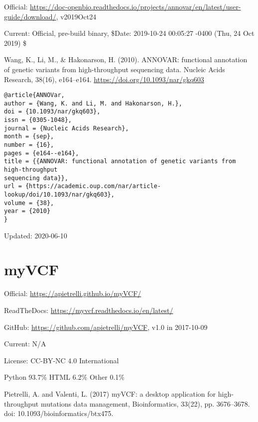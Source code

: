 \documentclass[]{article}
\begin{document}
Official: \url{https://doc-openbio.readthedocs.io/projects/annovar/en/latest/user-guide/download/}, v2019Oct24

Current: Official, pre-build binary, \$Date: 2019-10-24 00:05:27 -0400 (Thu, 24 Oct 2019) \$

Wang, K., Li, M., \& Hakonarson, H. (2010). ANNOVAR: functional annotation of genetic variants from high-throughput sequencing data. Nucleic Acids Research, 38(16), e164–e164. \url{https://doi.org/10.1093/nar/gkq603}

\begin{verbatim}
@article{ANNOVar,
author = {Wang, K. and Li, M. and Hakonarson, H.},
doi = {10.1093/nar/gkq603},
issn = {0305-1048},
journal = {Nucleic Acids Research},
month = {sep},
number = {16},
pages = {e164--e164},
title = {{ANNOVAR: functional annotation of genetic variants from high-throughput
sequencing data}},
url = {https://academic.oup.com/nar/article-lookup/doi/10.1093/nar/gkq603},
volume = {38},
year = {2010}
}
\end{verbatim}

Updated: 2020-06-10

\section{myVCF}

Official: \url{https://apietrelli.github.io/myVCF/}

ReadTheDocs: \url{https://myvcf.readthedocs.io/en/latest/}

GitHub: \url{https://github.com/apietrelli/myVCF}, v1.0 in 2017-10-09

Current: N/A

License: CC-BY-NC 4.0 International

Python 93.7\% HTML 6.2\% Other 0.1\%

Pietrelli, A. and Valenti, L. (2017) myVCF: a desktop application for high-throughput mutations data management, Bioinformatics, 33(22), pp. 3676–3678. doi: 10.1093/bioinformatics/btx475.
\end{document}
